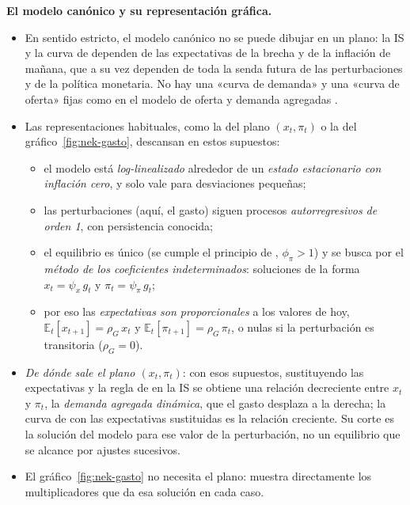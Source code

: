 \documentclass[11pt]{article}
\begin{document}
\begin{anotaciones}
\textbf{El modelo canónico y su representación gráfica.}
\begin{itemize}
\item En sentido estricto, el modelo canónico no se puede dibujar en un plano: la IS y la curva de  dependen de las expectativas de la brecha y de la inflación de mañana, que a su vez dependen de toda la senda futura de las perturbaciones y de la política monetaria. No hay una «curva de demanda» y una «curva de oferta» fijas como en el modelo de oferta y demanda agregadas .
\item Las representaciones habituales, como la del plano $(x_t,\pi_t)$  o la del gráfico~\ref{fig:nek-gasto}, descansan en estos supuestos:
  \begin{itemize}
  \item el modelo está \emph{log-linealizado} alrededor de un \emph{estado estacionario con inflación cero}, y solo vale para desviaciones pequeñas;
  \item las perturbaciones (aquí, el gasto) siguen procesos \emph{autorregresivos de orden 1}, con persistencia conocida;
  \item el equilibrio es único (se cumple el principio de , $\phi_\pi>1$) y se busca por el \emph{método de los coeficientes indeterminados}: soluciones de la forma $x_t=\psi_x\,g_t$ y $\pi_t=\psi_\pi\,g_t$;
  \item por eso las \emph{expectativas son proporcionales} a los valores de hoy, $\mathbb{E}_t[x_{t+1}]=\rho_G\,x_t$ y $\mathbb{E}_t[\pi_{t+1}]=\rho_G\,\pi_t$, o nulas si la perturbación es transitoria ($\rho_G=0$).
  \end{itemize}
\item \emph{De dónde sale el plano $(x_t,\pi_t)$}: con esos supuestos, sustituyendo las expectativas y la regla de  en la IS se obtiene una relación decreciente entre $x_t$ y $\pi_t$, la \emph{demanda agregada dinámica}, que el gasto desplaza a la derecha; la curva de  con las expectativas sustituidas es la relación creciente. Su corte es la solución del modelo para ese valor de la perturbación, no un equilibrio que se alcance por ajustes sucesivos.
\item El gráfico~\ref{fig:nek-gasto} no necesita el plano: muestra directamente los multiplicadores que da esa solución en cada caso.
\end{itemize}
\end{anotaciones}
\end{document}
